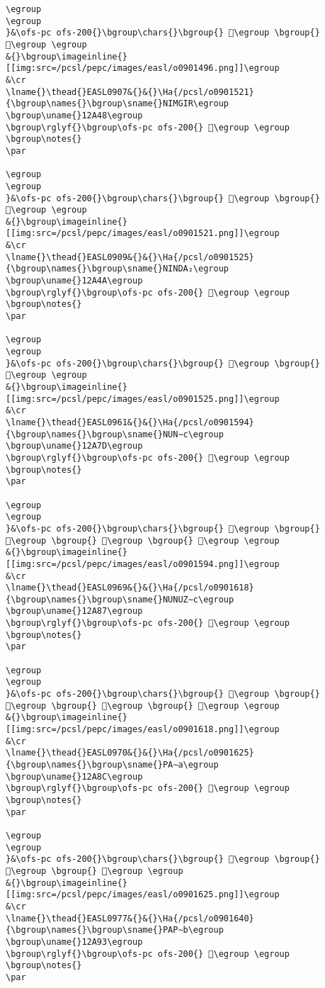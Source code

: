 \begin{verbatim}
\egroup
\egroup
}&\ofs-pc ofs-200{}\bgroup\chars{}\bgroup{} 𒨷\egroup \bgroup{} 𒨹\egroup \egroup
&{}\bgroup\imageinline{}[[img:src=/pcsl/pepc/images/easl/o0901496.png]]\egroup
&\cr
\lname{}\thead{}EASL0907&{}&{}\Ha{/pcsl/o0901521}{\bgroup\names{}\bgroup\sname{}NIMGIR\egroup
\bgroup\uname{}12A48\egroup
\bgroup\rglyf{}\bgroup\ofs-pc ofs-200{} 𒩈\egroup \egroup
\bgroup\notes{}
\par 

\egroup
\egroup
}&\ofs-pc ofs-200{}\bgroup\chars{}\bgroup{} 𒩇\egroup \bgroup{} 𒩈\egroup \egroup
&{}\bgroup\imageinline{}[[img:src=/pcsl/pepc/images/easl/o0901521.png]]\egroup
&\cr
\lname{}\thead{}EASL0909&{}&{}\Ha{/pcsl/o0901525}{\bgroup\names{}\bgroup\sname{}NINDA₂\egroup
\bgroup\uname{}12A4A\egroup
\bgroup\rglyf{}\bgroup\ofs-pc ofs-200{} 𒩊\egroup \egroup
\bgroup\notes{}
\par 

\egroup
\egroup
}&\ofs-pc ofs-200{}\bgroup\chars{}\bgroup{} 𒩧\egroup \bgroup{} 𒩊\egroup \egroup
&{}\bgroup\imageinline{}[[img:src=/pcsl/pepc/images/easl/o0901525.png]]\egroup
&\cr
\lname{}\thead{}EASL0961&{}&{}\Ha{/pcsl/o0901594}{\bgroup\names{}\bgroup\sname{}NUN∼c\egroup
\bgroup\uname{}12A7D\egroup
\bgroup\rglyf{}\bgroup\ofs-pc ofs-200{} 𒩽\egroup \egroup
\bgroup\notes{}
\par 

\egroup
\egroup
}&\ofs-pc ofs-200{}\bgroup\chars{}\bgroup{} 𒩼\egroup \bgroup{} 𒩽\egroup \bgroup{} 𒩾\egroup \bgroup{} 𒩿\egroup \egroup
&{}\bgroup\imageinline{}[[img:src=/pcsl/pepc/images/easl/o0901594.png]]\egroup
&\cr
\lname{}\thead{}EASL0969&{}&{}\Ha{/pcsl/o0901618}{\bgroup\names{}\bgroup\sname{}NUNUZ∼c\egroup
\bgroup\uname{}12A87\egroup
\bgroup\rglyf{}\bgroup\ofs-pc ofs-200{} 𒪇\egroup \egroup
\bgroup\notes{}
\par 

\egroup
\egroup
}&\ofs-pc ofs-200{}\bgroup\chars{}\bgroup{} 𒪇\egroup \bgroup{} 𒪈\egroup \bgroup{} 𒪉\egroup \bgroup{} 𒪊\egroup \egroup
&{}\bgroup\imageinline{}[[img:src=/pcsl/pepc/images/easl/o0901618.png]]\egroup
&\cr
\lname{}\thead{}EASL0970&{}&{}\Ha{/pcsl/o0901625}{\bgroup\names{}\bgroup\sname{}PA∼a\egroup
\bgroup\uname{}12A8C\egroup
\bgroup\rglyf{}\bgroup\ofs-pc ofs-200{} 𒪌\egroup \egroup
\bgroup\notes{}
\par 

\egroup
\egroup
}&\ofs-pc ofs-200{}\bgroup\chars{}\bgroup{} 𒪋\egroup \bgroup{} 𒪌\egroup \bgroup{} 𒪍\egroup \egroup
&{}\bgroup\imageinline{}[[img:src=/pcsl/pepc/images/easl/o0901625.png]]\egroup
&\cr
\lname{}\thead{}EASL0977&{}&{}\Ha{/pcsl/o0901640}{\bgroup\names{}\bgroup\sname{}PAP∼b\egroup
\bgroup\uname{}12A93\egroup
\bgroup\rglyf{}\bgroup\ofs-pc ofs-200{} 𒪓\egroup \egroup
\bgroup\notes{}
\par 


\end{verbatim}

